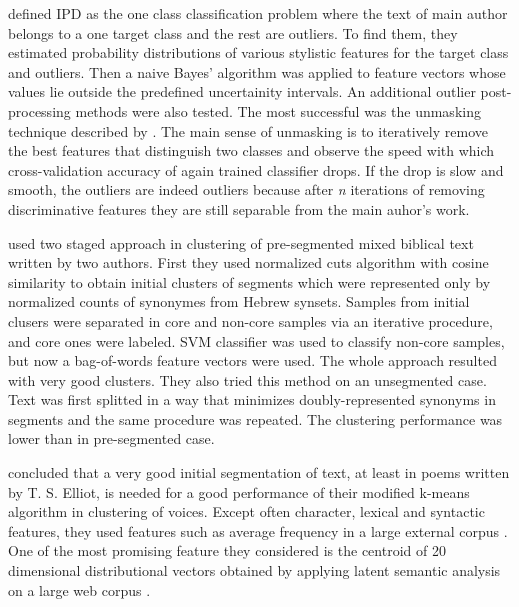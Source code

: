 \documentclass[10pt, a4paper]{article}
\begin{document}
\citet{stein-2011} defined IPD as the one class classification problem where the text of main author belongs to a one target class and the rest are outliers. To find them, they estimated probability distributions of various stylistic features for the target class and outliers. Then a naive Bayes' algorithm was applied to feature vectors whose values lie outside the predefined uncertainity intervals. An additional outlier post-processing methods were also tested. The most successful was the unmasking technique described by \citet{koppel-2009}. The main sense of unmasking is to iteratively remove the best features that distinguish two classes and observe the speed with which cross-validation accuracy of again trained classifier drops. If the drop is slow and smooth, the outliers are indeed outliers because after \textit{n} iterations of removing discriminative features they are still separable from the main auhor's work.

 \citet{koppel-2011} used two staged approach in clustering of pre-segmented mixed biblical text written by two authors. First they used normalized cuts algorithm with cosine similarity to obtain initial clusters of segments which were represented only by normalized counts of synonymes from Hebrew synsets. Samples from initial clusers were separated in core and non-core samples via an iterative procedure, and core ones were labeled. SVM classifier was used to classify non-core samples, but now a bag-of-words feature vectors were used. The whole approach resulted with very good clusters. They also tried this method on an unsegmented case. Text was first splitted in a way that minimizes doubly-represented synonyms in segments and the same procedure was repeated. The clustering performance was lower than in pre-segmented case.

\citet{brooke-2013} concluded that a very good initial segmentation of text, at least in poems written by T. S. Elliot, is needed for a good performance of their modified k-means algorithm in clustering of voices. Except often character, lexical and syntactic features, they used features such as average frequency in a large  external corpus \citep{brants-2006}. One of the most promising feature they considered is the centroid of 20 dimensional distributional vectors obtained by applying latent semantic analysis on a large web corpus \cite{landauer-1997}.
\end{document}
